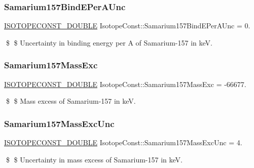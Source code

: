 \subsubsection{\texorpdfstring{Samarium157\+Bind\+E\+Per\+A\+Unc}{Samarium157BindEPerAUnc}}
{\footnotesize\ttfamily \mbox{\hyperlink{group___isotope_const-_macros_ga8f45a7272ce02c0b4c65c44636ed719a}{I\+S\+O\+T\+O\+P\+E\+C\+O\+N\+S\+T\+\_\+\+D\+O\+U\+B\+LE}} Isotope\+Const\+::\+Samarium157\+Bind\+E\+Per\+A\+Unc = 0.}

\$ \$ Uncertainty in binding energy per A of Samarium-\/157 in keV. \mbox{\label{group___isotope_const-_samarium-_sm157_ga8955bacf527e2087f804efcf77ee4a95}} 
\subsubsection{\texorpdfstring{Samarium157\+Mass\+Exc}{Samarium157MassExc}}
{\footnotesize\ttfamily \mbox{\hyperlink{group___isotope_const-_macros_ga8f45a7272ce02c0b4c65c44636ed719a}{I\+S\+O\+T\+O\+P\+E\+C\+O\+N\+S\+T\+\_\+\+D\+O\+U\+B\+LE}} Isotope\+Const\+::\+Samarium157\+Mass\+Exc = -\/66677.}

\$ \$ Mass excess of Samarium-\/157 in keV. \mbox{\label{group___isotope_const-_samarium-_sm157_ga2e28ad9908af180350e21cb2b9119fd9}} 
\subsubsection{\texorpdfstring{Samarium157\+Mass\+Exc\+Unc}{Samarium157MassExcUnc}}
{\footnotesize\ttfamily \mbox{\hyperlink{group___isotope_const-_macros_ga8f45a7272ce02c0b4c65c44636ed719a}{I\+S\+O\+T\+O\+P\+E\+C\+O\+N\+S\+T\+\_\+\+D\+O\+U\+B\+LE}} Isotope\+Const\+::\+Samarium157\+Mass\+Exc\+Unc = 4.}

\$ \$ Uncertainty in mass excess of Samarium-\/157 in keV. \mbox{\label{group___isotope_const-_samarium-_sm157_ga842dc24de24182f62022c2d7a04b6f9d}} 
